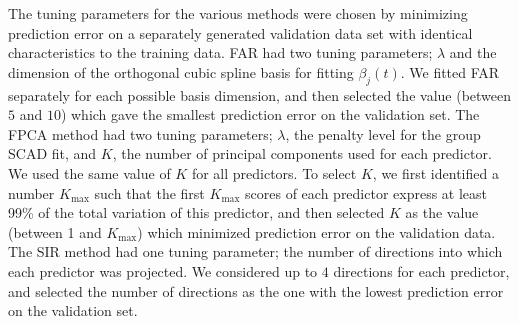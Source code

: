\documentclass[aos,MSNbibl,dvips]{arximspdf}
\begin{document}

The tuning parameters for the various methods were chosen by minimizing
prediction error on a separately generated validation data set with
identical characteristics to the training data. FAR had two tuning
parameters; $\lambda$ and the dimension of the orthogonal cubic spline
basis for fitting $\beta_j(t)$. We fitted FAR separately for each
possible basis dimension, and then selected the value (between $5$ and
$10$) which gave the smallest prediction error on the validation set.
The FPCA method had two tuning parameters; $\lambda$, the penalty
level for the group SCAD fit, and $K$, the number of principal
components used for each predictor. We used the same value of $K$ for
all predictors. To select $K$, we first identified a number $K_{\max}$
such that the first $K_{\max}$ scores of each predictor express at
least 99\% of the total variation of this predictor, and then selected
$K$ as the value (between 1 and $K_{\max}$) which minimized prediction
error on the validation data. The SIR method had one tuning parameter;
the number of directions into which each predictor was projected. We
considered up to $4$ directions for each predictor, and selected the
number of directions as the one with the lowest prediction error on the
validation set.
\end{document}
